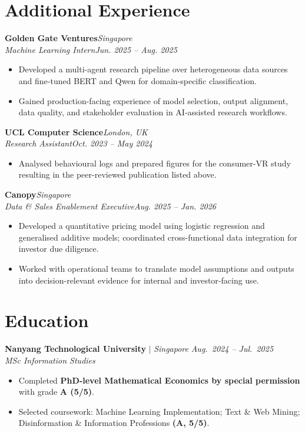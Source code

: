 \documentclass[11pt,a4paper]{article}
\newcommand{\cvheading}[4]{%
  \noindent\textbf{#1}\hfill\textit{#2}\\[-1pt]
  \textit{#3}\hfill\textit{#4}\\[-5pt]
}
\begin{document}
\section{Additional Experience}
\cvheading{Golden Gate Ventures}{Singapore}{Machine Learning Intern}{Jun. 2025 -- Aug. 2025}
\begin{itemize}
  \item Developed a multi-agent research pipeline over heterogeneous data sources and fine-tuned BERT and Qwen for domain-specific classification.
  \item Gained production-facing experience of model selection, output alignment, data quality, and stakeholder evaluation in AI-assisted research workflows.
\end{itemize}
\cvheading{UCL Computer Science}{London, UK}{Research Assistant}{Oct. 2023 -- May 2024}
\begin{itemize}
  \item Analysed behavioural logs and prepared figures for the consumer-VR study resulting in the peer-reviewed publication listed above.
\end{itemize}
\cvheading{Canopy}{Singapore}{Data \& Sales Enablement Executive}{Aug. 2025 -- Jan. 2026}
\begin{itemize}
  \item Developed a quantitative pricing model using logistic regression and generalised additive models; coordinated cross-functional data integration for investor due diligence.
  \item Worked with operational teams to translate model assumptions and outputs into decision-relevant evidence for internal and investor-facing use.
\end{itemize}

\section{Education}
\textbf{Nanyang Technological University} $|$ \textit{Singapore}
\hfill \textit{Aug.\ 2024 -- Jul.\ 2025}\\
\textit{MSc Information Studies}
\begin{itemize}
  \item Completed \textbf{PhD-level Mathematical Economics by special
        permission} with grade \textbf{A (5/5)}.
  \item Selected coursework: Machine Learning Implementation; Text \& Web
        Mining; Disinformation \& Information Professions \textbf{(A, 5/5)}.
\end{itemize}
\end{document}
